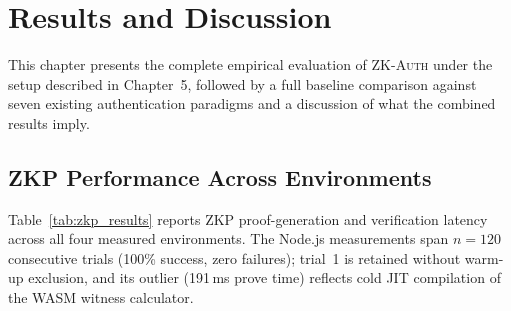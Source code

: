 \documentclass[12pt,a4paper,oneside]{report}
\begin{document}
\chapter{Results and Discussion}

This chapter presents the complete empirical evaluation of
\textsc{ZK-Auth} under the setup described in Chapter~5, followed by a
full baseline comparison against seven existing authentication paradigms
and a discussion of what the combined results imply.

\section{ZKP Performance Across Environments}

Table~\ref{tab:zkp_results} reports ZKP proof-generation and verification
latency across all four measured environments. The Node.js measurements
span $n=120$ consecutive trials (100\% success, zero failures); trial~1 is
retained without warm-up exclusion, and its outlier (191\,ms prove time)
reflects cold JIT compilation of the WASM witness calculator.
\end{document}

